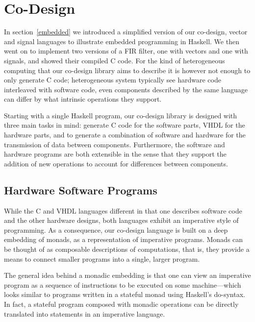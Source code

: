 \documentclass[../paper.tex]{subfiles}
\begin{document}
\chapter{Co-Design}
\label{codesign}

In section~\ref{embedded} we introduced a simplified version of our co-design, vector and signal languages to illustrate embedded programming in Haskell. We then went on to implement two versions of a FIR filter, one with vectors and one with signals, and showed their compiled C code. For the kind of heterogeneous computing that our co-design library aims to describe it is however not enough to only generate C code; heterogeneous system typically see hardware code interleaved with software code, even components described by the same language can differ by what intrinsic operations they support.


Starting with a single Haskell program, our co-design library is designed with three main tasks in mind: generate C code for the software parts, VHDL for the hardware parts, and to generate a combination of software and hardware for the transmission of data between components. Furthermore, the software and hardware programs are both extensible in the sense that they support the addition of new operations to account for differences between components.

\section{Hardware Software Programs}
\label{program}

While the C and VHDL languages different in that one describes software code and the other hardware designs, both languages exhibit an imperative style of programming. As a consequence, our co-design language is built on a deep embedding of monads, as a representation of imperative programs. Monads can be thought of as composable descriptions of computations, that is, they provide a means to connect smaller programs into a single, larger program.

The general idea behind a monadic embedding is that one can view an imperative program as a sequence of instructions to be executed on some machine---which looks similar to programs written in a stateful monad using Haskell's do-syntax. In fact, a stateful program composed with monadic operations can be directly translated into statements in an imperative language.
\end{document}
